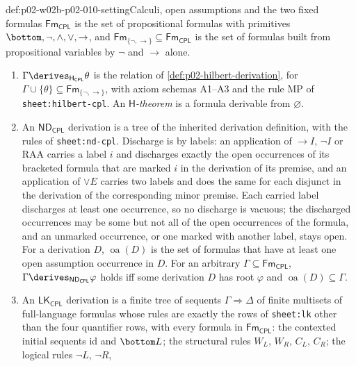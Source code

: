 \begin{hbconvention}{def:p02-w02b-p02-010-setting}{Calculi, open assumptions and the two fixed formulas}
\(\mathsf{Fm}_{\mathsf{CPL}}\) is the set of propositional formulas with
primitives \(\bottom,\neg,\land,\lor,\to\), and
\(\mathsf{Fm}_{\{\neg,\to\}}\subseteq\mathsf{Fm}_{\mathsf{CPL}}\) is the set
of formulas built from propositional variables by \(\neg\) and \(\to\) alone.
\begin{enumerate}
  \item \(\Gamma\derives_{\mathsf H_{\mathsf{CPL}}}\theta\) is the relation of
    \cref{def:p02-hilbert-derivation}, for
    \(\Gamma\cup\{\theta\}\subseteq\mathsf{Fm}_{\{\neg,\to\}}\), with axiom
    schemas A1--A3 and the rule MP of
    \texttt{sheet:\allowbreak hilbert-cpl}.  An
    \emph{\(\mathsf H\)-theorem} is a formula derivable from \(\varnothing\).
  \item An \(\mathsf{ND}_{\mathsf{CPL}}\) derivation is a tree of the
    inherited derivation definition, with the rules of
    \texttt{sheet:\allowbreak nd-cpl}.  Discharge is by labels: an
    application of \(\to I\), \(\neg I\) or RAA carries a label \(i\) and
    discharges exactly the open occurrences of its bracketed formula that
    are marked \(i\) in the derivation of its premise, and an application
    of \(\lor E\) carries two labels and does the same for each disjunct in
    the derivation of the corresponding minor premise.  Each carried label
    discharges at least one occurrence, so no discharge is vacuous; the
    discharged occurrences may be some but not all of the open occurrences
    of the formula, and an unmarked occurrence, or one marked with another
    label, stays open.  For a
    derivation \(D\), \(\operatorname{oa}(D)\) is the set of formulas that
    have at least one open assumption occurrence in \(D\).  For an arbitrary
    \(\Gamma\subseteq\mathsf{Fm}_{\mathsf{CPL}}\),
    \(\Gamma\derives_{\mathsf{ND}_{\mathsf{CPL}}}\varphi\) holds iff some
    derivation \(D\) has root \(\varphi\) and
    \(\operatorname{oa}(D)\subseteq\Gamma\).
  \item An \(\mathsf{LK}_{\mathsf{CPL}}\) derivation is a finite tree of
    sequents \(\Gamma\Rightarrow\Delta\) of finite multisets of
    full-language formulas whose rules are exactly the rows of
    \texttt{sheet:\allowbreak lk} other than the four quantifier rows, with
    every formula in \(\mathsf{Fm}_{\mathsf{CPL}}\): the contexted initial
    sequents id and \(\bottom L\); the structural rules \(W_L\), \(W_R\),
    \(C_L\), \(C_R\); the logical rules \(\neg L\), \(\neg R\),

\end{enumerate}
\end{hbconvention}
